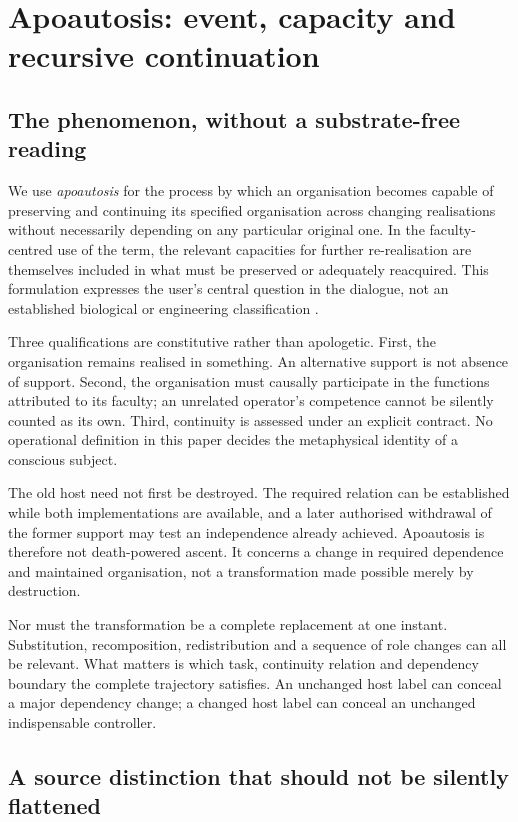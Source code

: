 \section{Apoautosis: event, capacity and recursive continuation}
\label{sec:concept}

\subsection{The phenomenon, without a substrate-free reading}

We use \emph{apoautosis} for the process by which an organisation becomes capable of preserving and continuing its specified organisation across changing realisations without necessarily depending on any particular original one. In the faculty-centred use of the term, the relevant capacities for further re-realisation are themselves included in what must be preserved or adequately reacquired. This formulation expresses the user's central question in the dialogue, not an established biological or engineering classification \cite{D,S2,S3}.

Three qualifications are constitutive rather than apologetic. First, the organisation remains realised in something. An alternative support is not absence of support. Second, the organisation must causally participate in the functions attributed to its faculty; an unrelated operator's competence cannot be silently counted as its own. Third, continuity is assessed under an explicit contract. No operational definition in this paper decides the metaphysical identity of a conscious subject.

The old host need not first be destroyed. The required relation can be established while both implementations are available, and a later authorised withdrawal of the former support may test an independence already achieved. Apoautosis is therefore not death-powered ascent. It concerns a change in required dependence and maintained organisation, not a transformation made possible merely by destruction.

Nor must the transformation be a complete replacement at one instant. Substitution, recomposition, redistribution and a sequence of role changes can all be relevant. What matters is which task, continuity relation and dependency boundary the complete trajectory satisfies. An unchanged host label can conceal a major dependency change; a changed host label can conceal an unchanged indispensable controller.

\subsection{A source distinction that should not be silently flattened}

